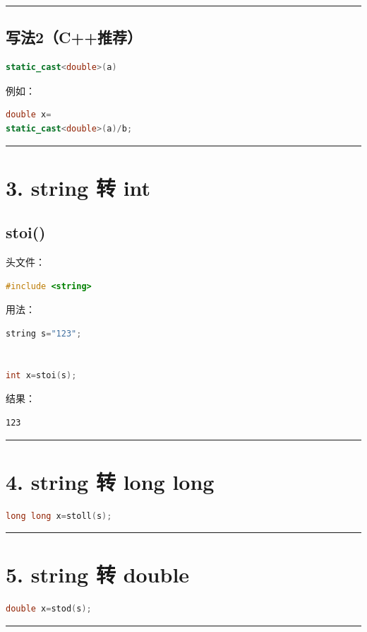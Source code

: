 \documentclass[10pt,twocolumn]{extarticle}
\begin{document}
\noindent\rule{\linewidth}{0.4pt}

\subsection{写法2（C++推荐）}
\begin{lstlisting}[language=C++]
static_cast<double>(a)
\end{lstlisting}
例如：
\begin{lstlisting}[language=C++]
double x=
static_cast<double>(a)/b;
\end{lstlisting}

\noindent\rule{\linewidth}{0.4pt}

\section{3. string 转 int}

\subsection{stoi()}
头文件：
\begin{lstlisting}[language=C++]
#include <string>
\end{lstlisting}
用法：
\begin{lstlisting}[language=C++]
string s="123";


int x=stoi(s);
\end{lstlisting}
结果：
\begin{lstlisting}
123
\end{lstlisting}

\noindent\rule{\linewidth}{0.4pt}

\section{4. string 转 long long}
\begin{lstlisting}[language=C++]
long long x=stoll(s);
\end{lstlisting}

\noindent\rule{\linewidth}{0.4pt}

\section{5. string 转 double}
\begin{lstlisting}[language=C++]
double x=stod(s);
\end{lstlisting}

\noindent\rule{\linewidth}{0.4pt}
\end{document}
